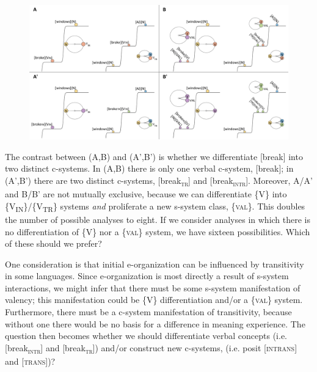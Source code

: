   
\begin{figure}
\includegraphics[width=\textwidth]{figures/Tilsen-img72.png}
\caption{\missingcaption}
\label{fig:}
\end{figure}
 

  The contrast between (A,B) and (A',B') is whether we differentiate [break] into two distinct c-systems. In (A,B) there is only one verbal c-system, [break]; in (A',B') there are two distinct c-systems, [break\textsc{\textsubscript{tr}}] and [break\textsc{\textsubscript{intr}}]. Moreover, A/A' and B/B' are not mutually exclusive, because we can differentiate \{V\} into \{V\textsubscript{IN}\}/\{V\textsubscript{TR}\} systems \textit{and} proliferate a new s-system class, \{\textsc{val}\}. This doubles the number of possible analyses to eight. If we consider analyses in which there is no differentiation of \{V\} nor a \{\textsc{val}\} system, we have sixteen possibilities. Which of these should we prefer? 

  One consideration is that initial e-organization can be influenced by transitivity in some languages. Since e-organization is most directly a result of s-system interactions, we might infer that there must be some s-system manifestation of valency; this manifestation could be \{V\} differentiation and/or a \{\textsc{val}\} system. Furthermore, there must be a c-system manifestation of transitivity, because without one there would be no basis for a difference in meaning experience. The question then becomes whether we should differentiate verbal concepts (i.e. [break\textsc{\textsubscript{intr}}] and [break\textsc{\textsubscript{tr}}]) and/or construct new c-systems, (i.e. posit [\textsc{intrans}] and [\textsc{trans}])?

